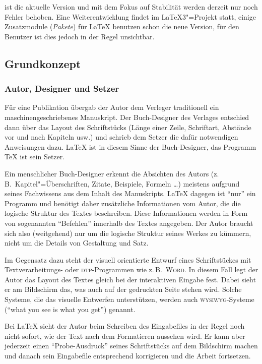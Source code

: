 \LaTeXe{} ist die aktuelle Version und mit dem Fokus auf Stabilität werden derzeit nur noch Fehler behoben. Eine Weiterentwicklung findet im \LaTeX{}3"=Projekt statt, einige Zusatzmodule (\emph{Pakete}) für \LaTeX{} benutzen schon die neue Version, für den Benutzer ist dies jedoch in der Regel unsichtbar.


\subsection{Grundkonzept}
 
\subsubsection{Autor, Designer und Setzer}
 
Für eine Publikation übergab der Autor dem Verleger
traditionell  ein maschinengeschriebenes Manuskript.  Der
Buch-Designer des Verlages entschied dann über das Layout des
Schriftstücks (Länge einer Zeile, Schriftart, Abstände vor
und nach Kapiteln usw.\@) und schrieb dem Setzer die
dafür notwendigen Anweisungen dazu.
\LaTeX{} ist in diesem Sinne der Buch-Designer, 
das Programm \TeX{} ist sein Setzer.
 
Ein menschlicher Buch-Designer erkennt die Absichten des Autors
(z.\,B.\ Kapitel"=Überschriften, Zitate, Beispiele, Formeln
\dots) meistens aufgrund seines Fachwissens aus dem Inhalt des
Manuskripts.  \LaTeX{} dagegen ist "`nur"' ein Programm und
benötigt daher zusätzliche Informationen vom Autor, die die
logische Struktur des Textes beschreiben.
Diese Informationen werden in Form von sogenannten "`Befehlen"'
innerhalb des Textes angegeben.
Der Autor braucht sich also
(weitgehend) nur um die logische Struktur seines Werkes zu kümmern,
nicht um die Details von Gestaltung und Satz.
 
Im Gegensatz dazu steht der visuell orientierte Entwurf eines
Schriftstückes mit Textverarbeitungs- oder \textsc{dtp}-Programmen wie z.\,B.\ 
\textsc{Word}.
In diesem Fall legt der Autor das Layout des Textes gleich bei der
interaktiven Eingabe fest. Dabei sieht er am Bildschirm das, was
auch auf der gedruckten Seite stehen wird. Solche Systeme, die das
visuelle Entwerfen unterstützen, werden auch \textsc{wysiwyg}-Systeme
("`what you see is what you get"') genannt.
 
Bei \LaTeX{} sieht der Autor beim Schreiben des Eingabefiles in
der Regel noch nicht sofort, wie der Text nach dem Formatieren 
aussehen wird. Er kann aber %
jederzeit einen "`Probe-Ausdruck"' seines Schriftstücks auf dem
Bildschirm machen und danach sein Eingabefile entsprechend 
korrigieren und die Arbeit fortsetzen.
 
